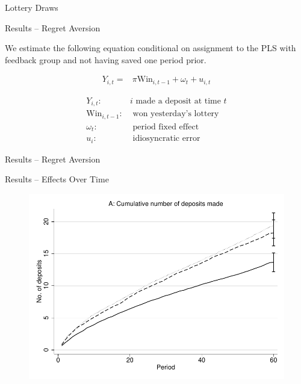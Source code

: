 \documentclass[aspectratio=169]{beamer}
\begin{document}
\begin{frame}{Lottery Draws}

	

\end{frame}

\begin{frame}{Results -- Regret Aversion}

	We estimate the following equation conditional on assignment to the PLS with feedback group and not having saved one period prior.

	\begin{equation} \begin{split}
		Y_{i,t} = & \pi \text{Win}_{i,t-1} + \omega_{t} + u_{i,t}
	\end{split} \label{eq:regret} \end{equation}

	\begin{align*}
	Y_{i,t}: & i \text{~made a deposit at time~} t \\
	\text{Win}_{i,t-1}: & \text{~won yesterday's lottery} \\
	\omega_t: & \text{~period fixed effect} \\
	u_i: & \text{~idiosyncratic error}
	\end{align*}

\end{frame}

\begin{frame}{Results -- Regret Aversion}
	
	


\end{frame}

\begin{frame}{Results -- Effects Over Time}

	\begin{figure}[H]
		\centering
		\includegraphics[height=0.8\textheight]{line-mobile_cumdeposits.pdf}
	\end{figure}

\end{frame}
\end{document}
